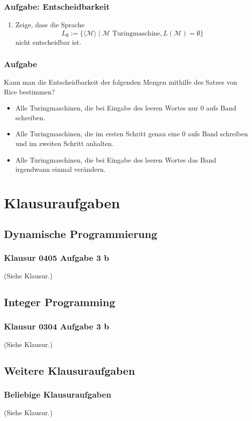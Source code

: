 \begin{frame}
\frametitle{Aufgabe: Entscheidbarkeit}
\begin{enumerate}
\item Zeige, dass die Sprache $$L_{\emptyset} := \{\langle \mathcal M \rangle \mid \mathcal M \text{ Turingmaschine}, L(\mathcal M) = \emptyset\}$$ nicht entscheidbar ist.
\end{enumerate}
\end{frame}

\begin{frame}
\frametitle{Aufgabe}
Kann man die Entscheidbarkeit der folgenden Mengen mithilfe des Satzes von Rice bestimmen?
\begin{itemize}
\item Alle Turingmaschinen, die bei Eingabe des leeren Wortes nur $0$ aufs Band schreiben.
\item Alle Turingmaschinen, die im ersten Schritt genau eine $0$ aufs Band schreiben und im zweiten Schritt anhalten. 
\item Alle Turingmaschinen, die bei Eingabe des leeren Wortes das Band irgendwann einmal verändern.
\end{itemize}
\end{frame}

\section{Klausuraufgaben}
\subsection{Dynamische Programmierung}
\begin{frame}
\frametitle{Klausur 0405 Aufgabe 3 b}
(Siehe Klausur.)
\end{frame}

\subsection{Integer Programming}
\begin{frame}
\frametitle{Klausur 0304 Aufgabe 3 b}
(Siehe Klausur.)
\end{frame}

\subsection{Weitere Klausuraufgaben}
\begin{frame}
\frametitle{Beliebige Klausuraufgaben}
(Siehe Klausur.)
\end{frame}


